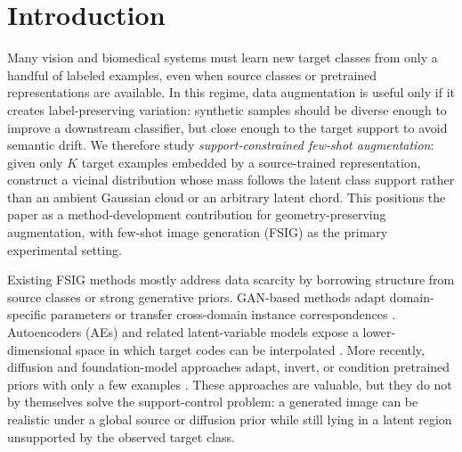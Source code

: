 \documentclass[preprint,12pt,number]{elsarticle}
\begin{document}
\section{Introduction}

Many vision and biomedical systems must learn new target classes from only a handful of labeled examples, even when source classes or pretrained representations are available. In this regime, data augmentation is useful only if it creates label-preserving variation: synthetic samples should be diverse enough to improve a downstream classifier, but close enough to the target support to avoid semantic drift. We therefore study \emph{support-constrained few-shot augmentation}: given only $K$ target examples embedded by a source-trained representation, construct a vicinal distribution whose mass follows the latent class support rather than an ambient Gaussian cloud or an arbitrary latent chord. This positions the paper as a method-development contribution for geometry-preserving augmentation, with few-shot image generation (FSIG) as the primary experimental setting.

Existing FSIG methods mostly address data scarcity by borrowing structure from source classes or strong generative priors. GAN-based methods adapt domain-specific parameters \cite{li2020few} or transfer cross-domain instance correspondences \cite{ojha2021few}. Autoencoders (AEs) and related latent-variable models expose a lower-dimensional space in which target codes can be interpolated \cite{berthelot2018understanding, wertheimer2020augmentation, qian2019improving}. More recently, diffusion and foundation-model approaches adapt, invert, or condition pretrained priors with only a few examples \citep{ho2020denoising, rombach2022high, gupta2024conditional, cao2024conditional, kim2024datadream, duan2024domaingallery, wang2024inversion, li2025hypdae}. These approaches are valuable, but they do not by themselves solve the support-control problem: a generated image can be realistic under a global source or diffusion prior while still lying in a latent region unsupported by the observed target class.
\end{document}
